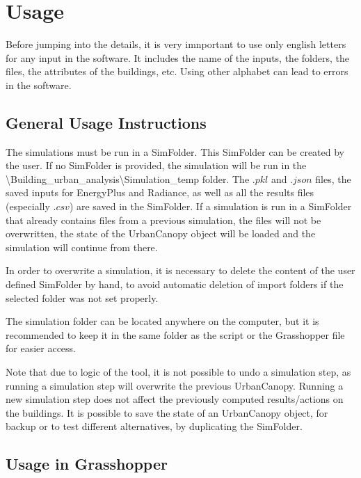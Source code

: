 \documentclass[a4paper,12pt]{article} %
\begin{document}
\section{Usage}
\label{sec:usage}
    Before jumping into the details, it is very imnportant to use only english letters for any input in the software.
    It includes the name of the inputs, the folders, the files, the attributes of the buildings, etc.
    Using other alphabet can lead to errors in the software.

    \subsection{General Usage Instructions}
    \label{subsec:general-usage-instructions}
    The simulations must be run in a \gls{SimFolder}.
    This \gls{SimFolder} can be created by the user.
    If no \gls{SimFolder} is provided, the simulation will be run in the \textbackslash Building\_urban\_analysis\textbackslash Simulation\_temp folder.
    The $.pkl$ and $.json$ files, the saved inputs for EnergyPlus and Radiance, as well as all the results files (especially $.csv$) are saved in the \gls{SimFolder}.
    If a simulation is run in a \gls{SimFolder} that already contains files from a previous simulation, the files will not be overwritten, the state of the \gls{UrbanCanopy} object will be loaded and the simulation will continue from there.

    In order to overwrite a simulation, it is necessary to delete the content of the user defined \gls{SimFolder} by hand, to avoid automatic deletion of import folders if the selected folder was not set properly.

    The simulation folder can be located anywhere on the computer, but it is recommended to keep it in the same folder as the script or the Grasshopper file for easier access.

    Note that due to logic of the tool, it is not possible to undo a simulation step, as running a simulation step will overwrite the previous \gls{UrbanCanopy}.
    Running a new simulation step does not affect the previously computed results/actions on the buildings.
    It is possible to save the state of an \gls{UrbanCanopy} object, for backup or to test different alternatives, by duplicating the \gls{SimFolder}.

    \subsection{Usage in Grasshopper}
    \label{subsec:usage-in-grasshopper}
\end{document}
